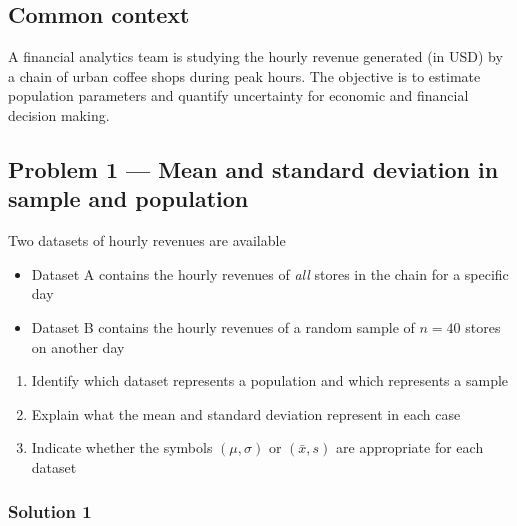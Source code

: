
\subsection*{Common context}

A financial analytics team is studying the hourly revenue generated (in USD) by a chain of urban coffee shops during peak hours. The objective is to estimate population parameters and quantify uncertainty for economic and financial decision making.


\subsection*{Problem 1 — Mean and standard deviation in sample and population}

Two datasets of hourly revenues are available

\begin{itemize}
	\item Dataset A contains the hourly revenues of \emph{all} stores in the chain for a specific day
	\item Dataset B contains the hourly revenues of a random sample of $n = 40$ stores on another day
\end{itemize}

\begin{enumerate}
	\item Identify which dataset represents a population and which represents a sample
	\item Explain what the mean and standard deviation represent in each case
	\item Indicate whether the symbols $(\mu,\sigma)$ or $(\bar{x},s)$ are appropriate for each dataset
\end{enumerate}

\subsubsection*{Solution 1}

